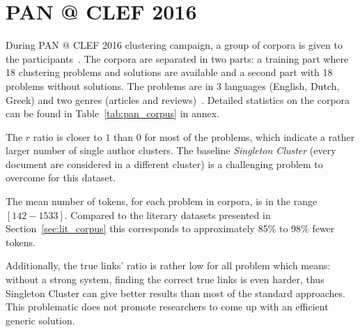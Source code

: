 \section{PAN @ CLEF 2016}

During PAN @ CLEF 2016 clustering campaign, a group of corpora is given to the participants~\cite{pan16_corpus}.
The corpora are separated in two parts: a training part where 18 clustering problems and solutions are available and a second part with 18 problems without solutions.
The problems are in 3 languages (English, Dutch, Greek) and two genres (articles and reviews)~\cite{pan16}.
Detailed statistics on the corpora can be found in Table~\ref{tab:pan_corpus} in annex.

The $r$ ratio is closer to $1$ than $0$ for most of the problems, which indicate a rather larger number of single author clusters.
The baseline \textit{Singleton Cluster} (every document are considered in a different cluster) is a challenging problem to overcome for this dataset.

The mean number of tokens, for each problem in corpora, is in the range $[142-1533]$.
Compared to the literary datasets presented in Section~\ref{sec:lit_corpus} this corresponds to approximately 85\% to 98\% fewer tokens.

Additionally, the true links' ratio is rather low for all problem which means: without a strong system, finding the correct true links is even harder, thus Singleton Cluster can give better results than most of the standard approaches.
This problematic does not promote researchers to come up with an efficient generic solution.
